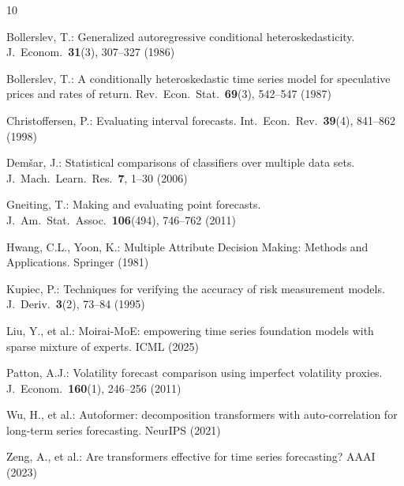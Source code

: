 \documentclass[runningheads,a4paper]{llncs}
\begin{document}
\begin{thebibliography}{10}

Bollerslev, T.: Generalized autoregressive conditional heteroskedasticity.
J.\ Econom.\ \textbf{31}(3), 307--327 (1986)

Bollerslev, T.: A conditionally heteroskedastic time series model for speculative prices and rates of return.
Rev.\ Econ.\ Stat.\ \textbf{69}(3), 542--547 (1987)

Christoffersen, P.: Evaluating interval forecasts.
Int.\ Econ.\ Rev.\ \textbf{39}(4), 841--862 (1998)

Dem\v{s}ar, J.: Statistical comparisons of classifiers over multiple data sets.
J.\ Mach.\ Learn.\ Res.\ \textbf{7}, 1--30 (2006)

Gneiting, T.: Making and evaluating point forecasts.
J.\ Am.\ Stat.\ Assoc.\ \textbf{106}(494), 746--762 (2011)

Hwang, C.L., Yoon, K.: Multiple Attribute Decision Making: Methods and Applications.
Springer (1981)

Kupiec, P.: Techniques for verifying the accuracy of risk measurement models.
J.\ Deriv.\ \textbf{3}(2), 73--84 (1995)

Liu, Y., et al.: Moirai-MoE: empowering time series foundation models with sparse mixture of experts.
ICML (2025)

Patton, A.J.: Volatility forecast comparison using imperfect volatility proxies.
J.\ Econom.\ \textbf{160}(1), 246--256 (2011)

Wu, H., et al.: Autoformer: decomposition transformers with auto-correlation for long-term series forecasting.
NeurIPS (2021)

Zeng, A., et al.: Are transformers effective for time series forecasting?
AAAI (2023)

\end{thebibliography}
\end{document}
